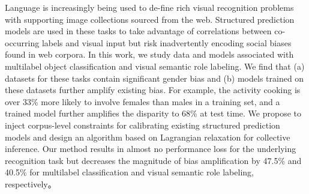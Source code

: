 Language is increasingly being used to de-fine rich visual recognition problems with supporting image collections sourced from the web. Structured prediction models are used  in  these  tasks  to  take  advantage              of correlations between  co-occurring  labels and visual input but risk inadvertently encoding social biases found in web corpora. In this work, we study data and models associated with multilabel object classification and visual semantic role labeling. We find that (a) datasets for these tasks contain significant gender bias and (b) models  trained  on  these  datasets  further  amplify existing bias.             For example,  the activity cooking is over 33\% more likely to involve females  than  males  in  a  training set, and a trained model further amplifies the disparity to 68\% at test time.  We propose to inject corpus-level constraints for calibrating existing structured prediction models and design an algorithm based on Lagrangian relaxation for collective inference.  Our method results in almost no performance loss for the underlying recognition task but decreases the magnitude of bias amplification by 47.5\% and 40.5\% for multilabel classification and visual semantic role labeling, respectively。
